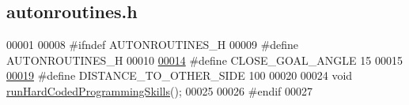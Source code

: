 \hypertarget{autonroutines_8h_source}{}\subsection{autonroutines.\+h}
\label{autonroutines_8h_source}

\begin{DoxyCode}
00001 
00008 \textcolor{preprocessor}{#ifndef AUTONROUTINES\_H}
00009 \textcolor{preprocessor}{#define AUTONROUTINES\_H}
00010 
\hypertarget{autonroutines_8h_source.tex_l00014}{}\hyperlink{autonroutines_8h_aa165645a0873b1a6d4e2260e31201afe}{00014} \textcolor{preprocessor}{#define CLOSE\_GOAL\_ANGLE 15}
00015 
\hypertarget{autonroutines_8h_source.tex_l00019}{}\hyperlink{autonroutines_8h_a2befdcf4842481d11a6058994d8fbef7}{00019} \textcolor{preprocessor}{#define DISTANCE\_TO\_OTHER\_SIDE 100}
00020 
00024 \textcolor{keywordtype}{void} \hyperlink{autonroutines_8h_adfa547bf86c78d482d16cb15a4ddd642}{runHardCodedProgrammingSkills}();
00025 
00026 \textcolor{preprocessor}{#endif}
00027 
\end{DoxyCode}
